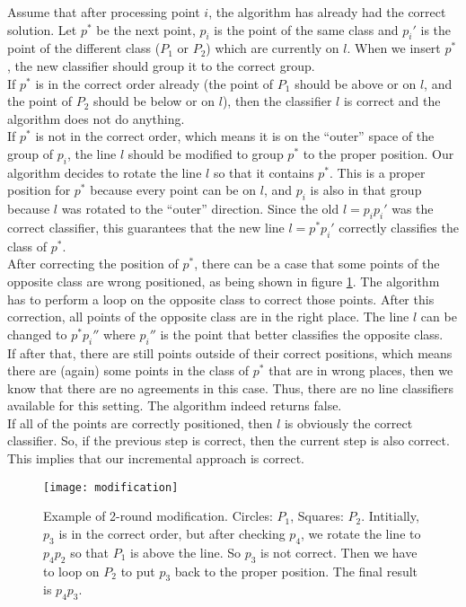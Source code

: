 Assume that after processing point $i$, the algorithm has already had the correct solution. Let $p^*$ be the next point, $p_i$ is the point of the same class and $p_i'$ is the point of the different class ($P_1$ or $P_2$) which are 
currently on $l$. When we insert $p^*$, the new classifier should group it to the correct group. \\

If $p^*$ is in the correct order already (the point of $P_1$ should be above or on $l$, and the point of $P_2$ should be below or on $l$), then the classifier $l$ is correct and
the algorithm does not do anything. \\

If $p^*$ is not in the correct order, which means it is on the ``outer'' space of the group of $p_i$, the line $l$ should be modified to group $p^*$ to the proper position. Our algorithm decides to rotate the line $l$ so that it contains $p^*$. This is a proper position for $p^*$ because every point can be on $l$, and $p_i$ is also in that group because $l$ was rotated to the ``outer'' direction. Since the old $l = p_i p_i'$ was the correct classifier, this guarantees that the new line $l = p^* p_i'$ correctly classifies the class of $p^*$. \\ 

After correcting the position of $p^*$, there can be a case that some points of the opposite class are wrong positioned, as being shown in figure \ref{fig:modification}. The algorithm has to perform a loop on the opposite class to correct those points. After this correction, all points of the opposite class are in the right place. The line $l$ can be changed to $p^* p_i''$ where $p_i''$ is the point that better classifies the opposite class. \\

If after that, there are still points outside of their correct positions, which means there are (again) some points in the class of $p^*$ that are in wrong places, then we know that there are no agreements in this case. Thus, there are no line classifiers available for this setting. The algorithm indeed returns false. \\

If all of the points are correctly positioned, then $l$ is obviously the correct classifier. 
So, if the previous step is correct, then the current step is also correct. This implies that our incremental approach is correct. \\

\begin{figure}[h]
\centering
\texttt{[image: modification]}\\
\caption{Example of 2-round modification. Circles: $P_1$, Squares: $P_2$. 
Intitially, $p_3$ is in the correct order, but after checking $p_4$, we rotate the line to $p_4 p_2$ so that $P_1$ is above the line. So $p_3$ is not correct. Then we have to loop on $P_2$ to put $p_3$ back to the proper position. The final result is $p_4 p_3$.}
\label{fig:modification}
\end{figure}

